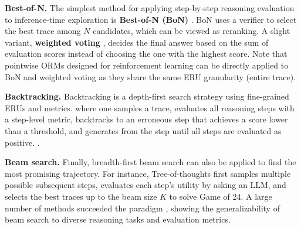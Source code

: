 \textbf{Best-of-N.} \hspace{0.1cm} The simplest method for applying step-by-step reasoning evaluation to inference-time exploration is \textbf{Best-of-N (BoN)} \citep{wang-etal-2024-math, cui2024ultrafeedbackboostinglanguagemodels, zhang2025lessonsdevelopingprocessreward}. BoN uses a verifier to select the best trace among $N$ candidates, which can be viewed as reranking. A slight variant, \textbf{weighted voting} \citep{yuan2024freeprocessrewardsprocess}, decides the final answer based on the sum of evaluation scores instead of choosing the one with the highest score. Note that pointwise ORMs designed for reinforcement learning can be directly applied to BoN and weighted voting as they share the same ERU granularity (entire trace).


\textbf{Backtracking.} \hspace{0.1cm} Backtracking is a depth-first search strategy using fine-grained ERUs and metrics. where one samples a trace, evaluates all reasoning steps with a step-level metric, backtracks to an erroneous step that achieves a score lower than a threshold, and generates from the step until all steps are evaluated as positive. \citep{NEURIPS2023_271db992, wu-etal-2024-synchronous, tyen-etal-2024-llms}.

\textbf{Beam search.} \hspace{0.1cm} Finally, breadth-first beam search can also be applied to find the most promising trajectory. For instance, Tree-of-thoughts \citep{NEURIPS2023_271db992} first samples multiple possible subsequent steps, evaluates each step's utility by asking an LLM, and selects the best traces up to the beam size $K$ to solve Game of 24. A large number of methods succeeded the paradigm \citep{NEURIPS2023_81fde95c, wu-etal-2024-synchronous, mo2024tree, zhu2024deductivebeamsearchdecoding}, showing the generalizability of beam search to diverse reasoning tasks and evaluation metrics. 